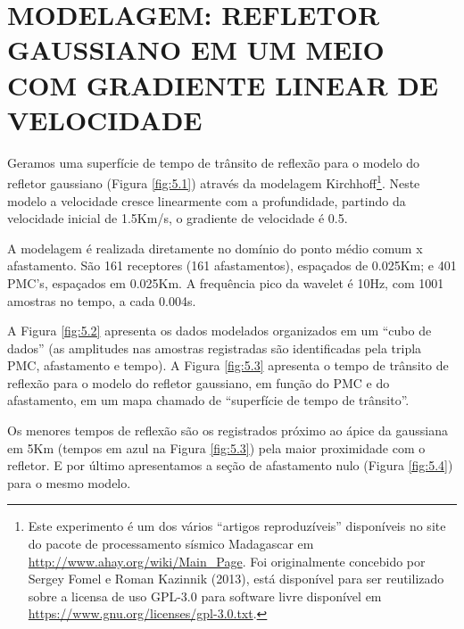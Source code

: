 %
% 
% 
% 
% 
% 
% 

\chapter{MODELAGEM: REFLETOR GAUSSIANO EM UM MEIO COM GRADIENTE LINEAR DE VELOCIDADE}
\label{cap5:modeling}

Geramos uma superfície de tempo de trânsito de reflexão para o modelo do refletor gaussiano (Figura \ref{fig:5.1})
através da modelagem Kirchhoff\footnote{Este experimento é um dos vários ``artigos reproduzíveis'' disponíveis no site
do pacote de processamento sísmico Madagascar em \url{http://www.ahay.org/wiki/Main_Page}. 
Foi originalmente concebido por Sergey Fomel e Roman Kazinnik (2013),
está disponível para ser reutilizado sobre a licensa de uso GPL-3.0 para software livre disponível
em \url{https://www.gnu.org/licenses/gpl-3.0.txt}.}\cite{fomel1}.
Neste modelo a velocidade cresce linearmente com a profundidade, partindo da velocidade inicial de
1.5Km/s, o gradiente de velocidade é 0.5. 

A modelagem é realizada diretamente no domínio do ponto médio comum x afastamento. São 161 receptores (161 afastamentos),
espaçados de 0.025Km; e 401 PMC's, espaçados em 0.025Km. A frequência pico da wavelet é 10Hz, com 1001 amostras no tempo, a
cada 0.004s.

A Figura \ref{fig:5.2} apresenta os dados modelados organizados em um ``cubo de dados'' (as amplitudes nas amostras registradas
são identificadas pela tripla PMC, afastamento e tempo). A Figura \ref{fig:5.3} apresenta o tempo de trânsito de reflexão para o
modelo do refletor gaussiano, em função do PMC e do afastamento, em um mapa chamado de ``superfície de tempo de trânsito''.

Os menores tempos de reflexão são os registrados próximo ao 
ápice da gaussiana em 5Km (tempos em azul na Figura \ref{fig:5.3}) pela maior proximidade com o refletor.
E por último apresentamos a seção de afastamento nulo (Figura \ref{fig:5.4}) para o mesmo modelo.

